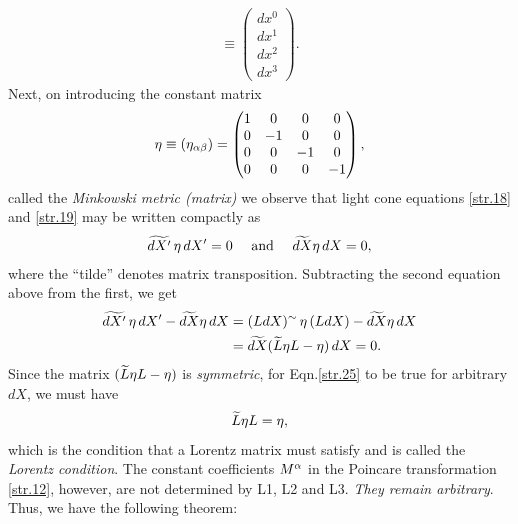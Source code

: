 \begin{small}
\begin{align}
\equiv\begin{pmatrix} dx^0\\dx^1\\dx^2\\dx^3
\end{pmatrix}.
\end{align}
Next, on introducing the constant matrix
\begin{align}\label{str.23}
{\eta}\equiv ({\eta}_{{\alpha}{\beta}})=\begin{pmatrix}
1& 0 & 0 & 0 \\
0& -1 & 0 & 0 \\
0& 0 & -1 & 0 \\
0& 0 & 0 & -1 \end{pmatrix} ,
\end{align}
called the \textsl{Minkowski metric (matrix)} we observe 
that light cone equations \eqref{str.18} and \eqref{str.19} 
may be written compactly as
\begin{align}\label{str.24}
\widetilde{dX'}\,{\eta}\,dX' =0 \quad \text{ and }
\quad \widetilde{dX}{\eta}\,dX =0,
\end{align}
where the ``tilde'' denotes matrix transposition. 
Subtracting the second equation above from the first, we get
\begin{align}\label{str.25}
\widetilde{dX'}\,{\eta}\,dX'- \widetilde{dX}{\eta}\,dX
&=({LdX})^\sim\, {\eta}\,(LdX)
-\widetilde{dX}{\eta}\,dX\notag\\&
=\widetilde{dX}(\widetilde{L}{\eta} L-{\eta}) \,dX=0.
\end{align}
Since the matrix $(\widetilde{L}{\eta} L-{\eta})$ is 
\textsl{symmetric}, 
for Eqn.\eqref{str.25} to be true for arbitrary 
$dX$, we must have
\begin{align}\label{str.26}
\widetilde{L}{\eta} L={\eta},
\end{align}
which is the condition that a Lorentz matrix must satisfy 
and is called the \textsl{Lorentz condition}. 
 The constant coefficients $M^{{\alpha}}$ in the 
Poincare transformation \eqref{str.12}, however, are not 
determined by L1, L2 and L3. \textsl{They remain 
arbitrary}. Thus, we have the following theorem:


\end{small}
